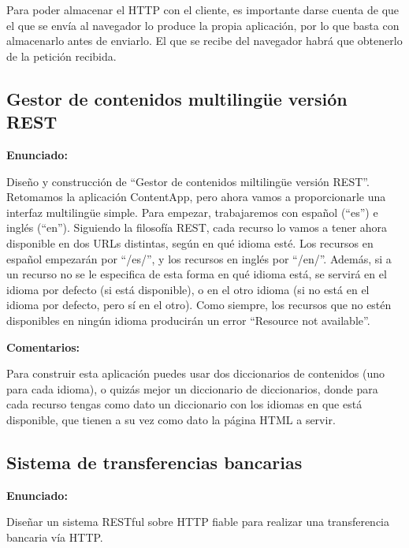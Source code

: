 Para poder almacenar el HTTP con el cliente, es importante darse cuenta de que el que se envía al navegador lo produce la propia aplicación, por lo que basta con almacenarlo antes de enviarlo. El que se recibe del navegador habrá que obtenerlo de la petición recibida.

\subsection{Gestor de contenidos multilingüe versión REST}
\label{subsec:contentappmulti}

\textbf{Enunciado:}

Diseño y construcción de ``Gestor de contenidos miltilingüe versión REST''. Retomamos la aplicación ContentApp, pero ahora vamos a proporcionarle una interfaz multilingüe simple. Para empezar, trabajaremos con español (``es'') e inglés (``en''). Siguiendo la filosofía REST, cada recurso lo vamos a tener ahora disponible en dos URLs distintas, según en qué idioma esté. Los recursos en español empezarán por ``/es/'', y los recursos en inglés por ``/en/''. Además, si a un recurso no se le especifica de esta forma en qué idioma está, se servirá en el idioma por defecto (si está disponible), o en el otro idioma (si no está en el idioma por defecto, pero sí en el otro). Como siempre, los recursos que no estén disponibles en ningún idioma producirán un error ``Resource not available''.

\textbf{Comentarios:}

Para construir esta aplicación puedes usar dos diccionarios de contenidos (uno para cada idioma), o quizás mejor un diccionario de diccionarios, donde para cada recurso tengas como dato un diccionario con los idiomas en que está disponible, que tienen a su vez como dato la página HTML a servir.


\subsection{Sistema de transferencias bancarias}
\label{subsec:transferencias-bancarias}

\textbf{Enunciado:}

Diseñar un sistema RESTful sobre HTTP fiable para realizar una transferencia bancaria vía HTTP.

